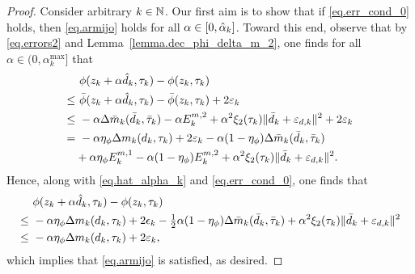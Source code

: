 \begin{proof}
  Consider arbitrary $k \in \mathbb{N}$.  Our first aim is to show that if \eqref{eq.err_cond_0} holds, then \eqref{eq.armijo} holds for all $\alpha \in [0,{\hat \alpha}_k]$.  Toward this end, observe that by \eqref{eq.errors2} and Lemma~\ref{lemma.dec_phi_delta_m_2}, one finds for all $\alpha \in (0, \alpha_k^{\max}]$ that
  \begin{align}
    &\ \phi(z_k+\alpha {\hat d}_k, \tau_k)  - \phi(z_k, \tau_k) \nonumber \\
    \leq&\ {\bar \phi}(z_k+\alpha {\hat d}_k, \tau_k) -  {\bar \phi}(z_k, \tau_k) + 2 \varepsilon_k \nonumber \\  
    \leq&\ -\alpha \Delta {\bar m}_k({\bar d}_k, {\bar \tau}_k) - \alpha E_k^{m, 2} + \alpha^2 \xi_2(\tau_k) \|{\bar d}_k + \varepsilon_{d,k}\|^2 + 2 \varepsilon_k \nonumber \\
    =&\ -\alpha \eta_\phi \Delta m_k( d_k, \tau_k) + 2 \varepsilon_k - \alpha (1-\eta_\phi) \Delta {\bar m}_k({\bar d}_k, {\bar \tau}_k) \nonumber \\
    &+ \alpha \eta_\phi E_k^{m, 1} - \alpha (1 - \eta_\phi) E_k^{m, 2} + \alpha^2 \xi_2(\tau_k) \|{\bar d}_k + \varepsilon_{d,k}\|^2. \label{eq.tmp_alpha_armijo_0}
  \end{align}
  Hence, along with \eqref{eq.hat_alpha_k} and \eqref{eq.err_cond_0}, one finds that
  \begin{align*}
    &\ \phi(z_k+\alpha {\hat d}_k, \tau_k) - \phi(z_k, \tau_k) \\
    \leq&\ -\alpha \eta_\phi \Delta m_k( d_k, \tau_k) + 2 \epsilon_k - \tfrac12 \alpha (1 - \eta_\phi) \Delta {\bar m}_k({\bar d}_k, {\bar \tau}_k) + \alpha^2 \xi_2(\tau_k) \|{\bar d}_k + \varepsilon_{d,k}\|^2 \\
    \leq&\ -\alpha \eta_\phi \Delta m_k( d_k, \tau_k) + 2 \varepsilon_k,
  \end{align*}
  which implies that \eqref{eq.armijo} is satisfied, as desired.
  

\end{proof}
